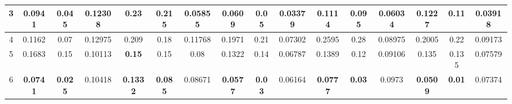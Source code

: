 \begin{table}[htbp]
{\begin{tabular}{@{}cccccccccccccccc@{}}
    \multicolumn{1}{|c|}{3}      & \multicolumn{1}{c|}{0.0941}          & \multicolumn{1}{c|}{0.045}          & \multicolumn{1}{c||}{0.12308}          & \multicolumn{1}{c|}{0.23}            & \multicolumn{1}{c|}{0.215}          & \multicolumn{1}{c||}{\textbf{0.05855}} & \multicolumn{1}{c|}{0.0609}          & \multicolumn{1}{c|}{\textbf{0.05}} & \multicolumn{1}{c||}{0.03379}          & \multicolumn{1}{c||}{0.1114}          & \multicolumn{1}{c|}{\textbf{0.095}} & \multicolumn{1}{c|}{0.06034}          & \multicolumn{1}{c|}{0.1227}          & \multicolumn{1}{c|}{\textbf{0.11}} & \multicolumn{1}{c|}{\textbf{0.03918}} \\ \midrule
    \multicolumn{1}{|c|}{4}      & \multicolumn{1}{c|}{0.1162}          & \multicolumn{1}{c|}{0.07}           & \multicolumn{1}{c||}{0.12975}          & \multicolumn{1}{c|}{0.209}           & \multicolumn{1}{c|}{0.18}           & \multicolumn{1}{c||}{0.11768}          & \multicolumn{1}{c|}{0.1971}          & \multicolumn{1}{c|}{0.21}          & \multicolumn{1}{c||}{0.07302}          & \multicolumn{1}{c||}{0.2595}          & \multicolumn{1}{c|}{0.28}           & \multicolumn{1}{c|}{0.08975}          & \multicolumn{1}{c|}{0.2005}          & \multicolumn{1}{c|}{0.22}          & \multicolumn{1}{c|}{0.09173}          \\ \midrule
    \multicolumn{1}{|c|}{5}      & \multicolumn{1}{c|}{0.1683}          & \multicolumn{1}{c|}{0.15}           & \multicolumn{1}{c||}{0.10113}          & \multicolumn{1}{c|}{\textbf{0.15}}   & \multicolumn{1}{c|}{0.15}           & \multicolumn{1}{c||}{0.08}             & \multicolumn{1}{c|}{0.1322}          & \multicolumn{1}{c|}{0.14}          & \multicolumn{1}{c||}{0.06787}          & \multicolumn{1}{c||}{0.1389}          & \multicolumn{1}{c|}{0.12}           & \multicolumn{1}{c|}{0.09106}          & \multicolumn{1}{c|}{0.135}           & \multicolumn{1}{c|}{0.135}         & \multicolumn{1}{c|}{0.07579}          \\ \midrule
    \multicolumn{1}{|c|}{6}      & \multicolumn{1}{c|}{\textbf{0.0741}} & \multicolumn{1}{c|}{\textbf{0.025}} & \multicolumn{1}{c||}{0.10418}          & \multicolumn{1}{c|}{\textbf{0.1332}} & \multicolumn{1}{c|}{\textbf{0.085}} & \multicolumn{1}{c||}{0.08671}          & \multicolumn{1}{c|}{\textbf{0.0577}} & \multicolumn{1}{c|}{\textbf{0.03}} & \multicolumn{1}{c||}{0.06164}          & \multicolumn{1}{c||}{\textbf{0.0777}} & \multicolumn{1}{c|}{\textbf{0.03}}  & \multicolumn{1}{c|}{0.0973}           & \multicolumn{1}{c|}{\textbf{0.0509}} & \multicolumn{1}{c|}{\textbf{0.01}} & \multicolumn{1}{c|}{0.07374}          \\ \midrule

\end{tabular}}
\end{table}
